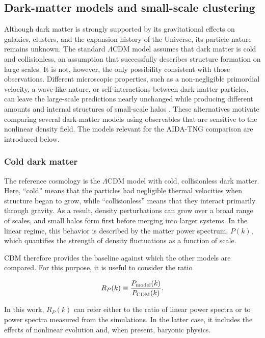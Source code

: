 \documentclass[%
 reprint,
nofootinbib,
 amsmath,amssymb,
 aps,
]{revtex4-2}
\begin{document}
\subsection{Dark-matter models and small-scale clustering}

Although dark matter is strongly supported by its gravitational effects on galaxies, clusters, and the expansion history of the Universe, its particle nature remains unknown. The standard $\Lambda$CDM model assumes that dark matter is cold and collisionless, an assumption that successfully describes structure formation on large scales. It is not, however, the only possibility consistent with those observations. Different microscopic properties, such as a non-negligible primordial velocity, a wave-like nature, or self-interactions between dark-matter particles, can leave the large-scale predictions nearly unchanged while producing different amounts and internal structures of small-scale halos \cite{bullock2017smallscale,marsh2021ultralight,tulin2018sidm}. These alternatives motivate comparing several dark-matter models using observables that are sensitive to the nonlinear density field. The models relevant for the AIDA-TNG comparison are introduced below.

\subsubsection{Cold dark matter}

The reference cosmology is the $\Lambda$CDM model with cold, collisionless dark matter. Here, ``cold'' means that the particles had negligible thermal velocities when structure began to grow, while ``collisionless'' means that they interact primarily through gravity. As a result, density perturbations can grow over a broad range of scales, and small halos form first before merging into larger systems. In the linear regime, this behavior is described by the matter power spectrum, $P(k)$, which quantifies the strength of density fluctuations as a function of scale.

CDM therefore provides the baseline against which the other models are compared. For this purpose, it is useful to consider the ratio

\begin{equation}
R_P(k) \equiv \frac{P_{\rm model}(k)}{P_{\rm CDM}(k)}.
\end{equation}

In this work, $R_P(k)$ can refer either to the ratio of linear power spectra or to power spectra measured from the simulations. In the latter case, it includes the effects of nonlinear evolution and, when present, baryonic physics.
\end{document}
